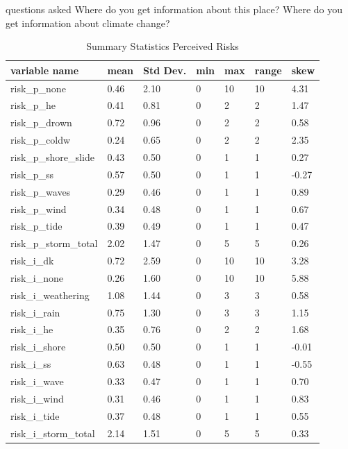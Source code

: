 questions asked Where do you get information about this place? Where do you get information about climate change?
\begin{center}
\begin{table}[h]
    \centering
    \begin{tabular}{|l|l|l|l|l|l|l|}
    \hline
        variable name & mean & Std Dev. & min & max & range & skew \\ \hline
        risk\_p\_none & 0.46 & 2.10 & 0 & 10 & 10 & 4.31\\ \hline
        risk\_p\_he & 0.41 & 0.81 & 0 & 2 & 2 & 1.47 \\ \hline
        risk\_p\_drown & 0.72 & 0.96 & 0 & 2 & 2 & 0.58  \\ \hline
        risk\_p\_coldw & 0.24 & 0.65 & 0 & 2 & 2 & 2.35  \\ \hline
        risk\_p\_shore\_slide & 0.43 & 0.50 & 0 & 1 & 1 & 0.27 \\ \hline
        risk\_p\_ss & 0.57 & 0.50 & 0 & 1 & 1 & -0.27  \\ \hline
        risk\_p\_waves & 0.29 & 0.46 & 0 & 1 & 1 & 0.89 \\ \hline
        risk\_p\_wind & 0.34 & 0.48 & 0 & 1 & 1 & 0.67  \\ \hline
        risk\_p\_tide & 0.39 & 0.49 & 0 & 1 & 1 & 0.47  \\ \hline
        risk\_p\_storm\_total & 2.02 & 1.47 & 0 & 5 & 5 & 0.26  \\ \hline
        risk\_i\_dk & 0.72 & 2.59 & 0 & 10 & 10 & 3.28  \\ \hline
        risk\_i\_none & 0.26 & 1.60 & 0 & 10 & 10 & 5.88 \\ \hline
        risk\_i\_weathering & 1.08 & 1.44 & 0 & 3 & 3 & 0.58  \\ \hline
        risk\_i\_rain & 0.75 & 1.30 & 0 & 3 & 3 & 1.15\\ \hline
        risk\_i\_he & 0.35 & 0.76 & 0 & 2 & 2 & 1.68 \\ \hline
        risk\_i\_shore & 0.50 & 0.50 & 0 & 1 & 1 & -0.01 \\ \hline
        risk\_i\_ss & 0.63 & 0.48 & 0 & 1 & 1 & -0.55  \\ \hline
        risk\_i\_wave & 0.33 & 0.47 & 0 & 1 & 1 & 0.70  \\ \hline
        risk\_i\_wind & 0.31 & 0.46 & 0 & 1 & 1 & 0.83 \\ \hline
        risk\_i\_tide & 0.37 & 0.48 & 0 & 1 & 1 & 0.55  \\ \hline
        risk\_i\_storm\_total & 2.14 & 1.51 & 0 & 5 & 5 & 0.33 \\ \hline
          \end{tabular}
    \caption{Summary Statistics Perceived Risks}
\label{table:summary_stats_percieved_risks}
\end{table}
\end{center}

